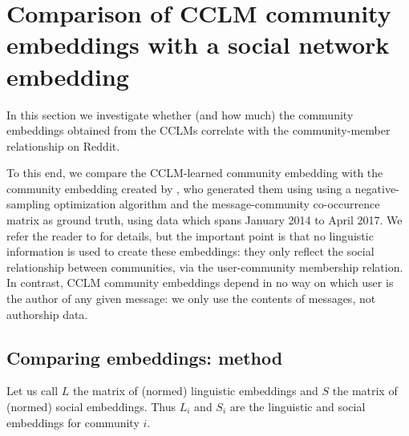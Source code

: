 \documentclass[11pt]{article}
\begin{document}




\section{Comparison of CCLM community embeddings with a social network embedding}\label{sec:embedding-analysis}

In this section we investigate whether (and how much) the community
embeddings obtained from the CCLMs correlate with the community-member
relationship on Reddit.

To this end, we compare the CCLM-learned community
embedding with the community embedding created by \citet{Kumar2018},
who generated them using using a negative-sampling optimization
algorithm and the message-community co-occurrence matrix as ground
truth, using data which spans January 2014 to April 2017.
We refer the reader
to \citet{Kumar2018}
for details, but the important point is that no linguistic
information is used to create these embeddings: they only reflect the social
relationship between communities, via 
the user-community membership relation. In contrast, CCLM community embeddings depend in no
way on which user is the author of any given message: we only use the
contents of messages, not authorship data.
%

\subsection{Comparing embeddings: method}

Let us call \(L\) the matrix of (normed) linguistic embeddings and \(S\) the matrix
of (normed) social embeddings. Thus \(L_i\) and \(S_i\) are the linguistic and
social embeddings for community \(i\).
\end{document}
